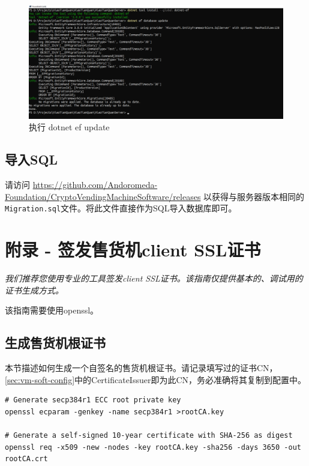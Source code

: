 \documentclass[a4paper,11pt]{article}
\theoremstyle{definition}
\begin{document}
    \begin{figure}[htbp]
    \minipage[b][][b]{\textwidth}
        \includegraphics[width=\linewidth]{ef-update.png}
        \caption{执行 dotnet ef update}
        \label{fig:ef-update}
    \endminipage\hfill
    \end{figure}

\subsection{导入SQL}

请访问 \url{https://github.com/Andoromeda-Foundation/CryptoVendingMachineSoftware/releases} 以获得与服务器版本相同的 \verb|Migration.sql|文件。将此文件直接作为SQL导入数据库即可。

\section{附录 - 签发售货机client SSL证书}\label{sec:ssl-cert}

\emph{我们推荐您使用专业的工具签发client SSL证书。该指南仅提供基本的、调试用的证书生成方式。}

该指南需要使用openssl。

\subsection{生成售货机根证书}\label{sec:ssl-cert:root}

本节描述如何生成一个自签名的售货机根证书。请记录填写过的证书CN，\ref{sec:vm-soft-config}中的CertificateIssuer即为此CN，务必准确将其复制到配置中。

\begin{lstlisting}
# Generate secp384r1 ECC root private key
openssl ecparam -genkey -name secp384r1 >rootCA.key

# Generate a self-signed 10-year certificate with SHA-256 as digest
openssl req -x509 -new -nodes -key rootCA.key -sha256 -days 3650 -out rootCA.crt
\end{lstlisting}
\end{document}
